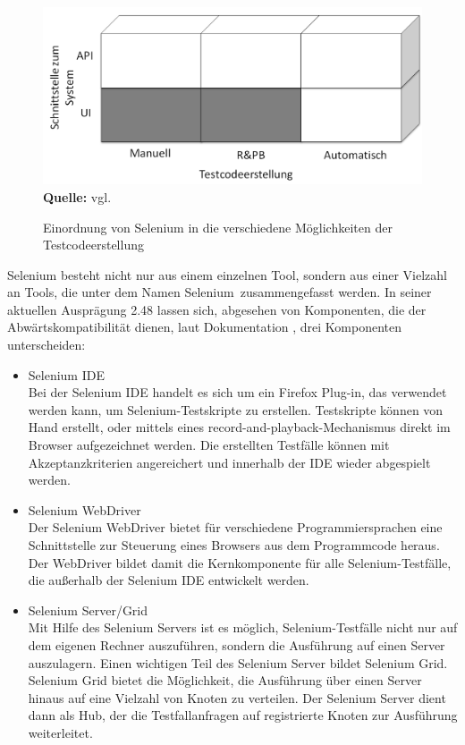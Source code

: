 \begin{figure}[htb]
  \centering  
  \includegraphics[scale=0.7]{img/bereicheTestcodeerstellungSelenium.png}\\
  \footnotesize\sffamily\textbf{Quelle:} vgl. \cite{meszaros_agile_2003}
  \caption{Einordnung von Selenium in die verschiedene Möglichkeiten der Testcodeerstellung}
  \label{fig:bereicheTestcodeerstellungSelenium}
\end{figure}

Selenium besteht nicht nur aus einem einzelnen Tool, sondern aus einer Vielzahl an Tools, die unter dem Namen \grq Selenium\grq\ zusammengefasst werden.
In seiner aktuellen Ausprägung 2.48 lassen sich, abgesehen von Komponenten, die der Abwärtskompatibilität dienen, laut Dokumentation \cite{selenium_selenium_2015-1}, drei Komponenten unterscheiden:

\begin{itemize}
\item Selenium IDE \\
Bei der Selenium IDE handelt es sich um ein Firefox Plug-in, das verwendet werden kann, um Selenium-Testskripte zu erstellen. Testskripte können von Hand erstellt, oder mittels eines \grq record-and-playback\grq -Mechanismus direkt im Browser aufgezeichnet werden. Die erstellten Testfälle können mit Akzeptanzkriterien angereichert und innerhalb der IDE wieder abgespielt werden.
\item Selenium WebDriver \\
Der Selenium WebDriver bietet für verschiedene Programmiersprachen eine Schnittstelle zur Steuerung eines Browsers aus dem Programmcode heraus. Der WebDriver bildet damit die Kernkomponente für alle Selenium-Testfälle, die außerhalb der Selenium IDE entwickelt werden.

\item Selenium Server/Grid \\
Mit Hilfe des Selenium Servers ist es möglich, Selenium-Testfälle nicht nur auf dem eigenen Rechner auszuführen, sondern die Ausführung auf einen Server auszulagern. Einen wichtigen Teil des Selenium Server bildet Selenium Grid. Selenium Grid bietet die Möglichkeit, die Ausführung über einen Server hinaus auf eine Vielzahl von Knoten zu verteilen. Der Selenium Server dient dann als Hub, der die Testfallanfragen auf registrierte Knoten zur Ausführung weiterleitet. 
\end{itemize}


